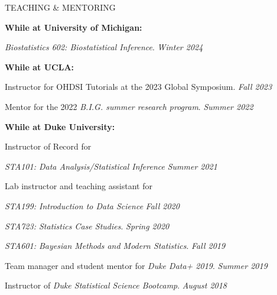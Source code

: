 \documentclass{resume} %
\newcommand{\thisYear}[1]{
	#1
}
\begin{document}
\begin{rSection}{TEACHING \& MENTORING}
	
\hspace*{-0.2in}\textbf{While at University of Michigan:}
	
		\thisYear{
    \emph{Biostatistics 602: Biostatistical Inference}.  \hfill {\em Winter 2024}
}

\smallskip 

\hspace*{-0.2in}\textbf{While at UCLA:}
	
	Instructor for OHDSI Tutorials at the 2023 Global Symposium.  \hfill {\em Fall 2023}
		
	Mentor for the 2022 \emph{B.I.G. summer research program}.  \hfill {\em Summer 2022}
	
\smallskip 
	
\hspace*{-0.2in}\textbf{While at Duke University:}
	
	Instructor of Record for 
	
	
	\emph{STA101: Data Analysis/Statistical Inference} \hfill {\em Summer 2021}
	
	Lab instructor and teaching assistant for 
	
	\hspace{0.2in} \emph{STA199: Introduction to Data Science} \hfill {\em Fall 2020}
	
	\hspace{0.2in} \emph{STA723: Statistics Case Studies}. \hfill {\em Spring 2020}
	
	\hspace{0.2in} \emph{STA601: Bayesian Methods and Modern Statistics}. \hfill {\em Fall 2019}
	
	
	Team manager and student mentor for \emph{Duke Data+ 2019}. \hfill {\em Summer 2019}
	
	Instructor of \emph{Duke Statistical Science Bootcamp}. \hfill {\em August 2018}
\end{rSection}
\end{document}
